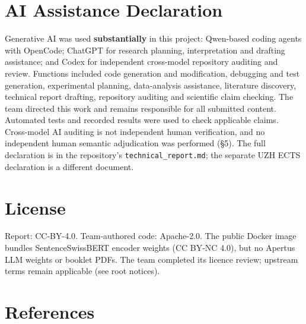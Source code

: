 \documentclass[10pt,a4paper]{article}
\begin{document}
\section*{AI Assistance Declaration}

Generative AI was used \textbf{substantially} in this project: Qwen-based coding agents with OpenCode; ChatGPT for research planning, interpretation and drafting assistance; and Codex for independent cross-model repository auditing and review. Functions included code generation and modification, debugging and test generation, experimental planning, data-analysis assistance, literature discovery, technical report drafting, repository auditing and scientific claim checking. The team directed this work and remains responsible for all submitted content. Automated tests and recorded results were used to check applicable claims. Cross-model AI auditing is not independent human verification, and no independent human semantic adjudication was performed (\S5). The full declaration is in the repository's \texttt{technical\_report.md}; the separate UZH ECTS declaration is a different document.

\section*{License}

Report: CC-BY-4.0. Team-authored code: Apache-2.0. The public Docker image bundles SentenceSwissBERT encoder weights (CC BY-NC 4.0), but no Apertus LLM weights or booklet PDFs. The team completed its licence review; upstream terms remain applicable (see root notices).

\section*{References}
\end{document}
